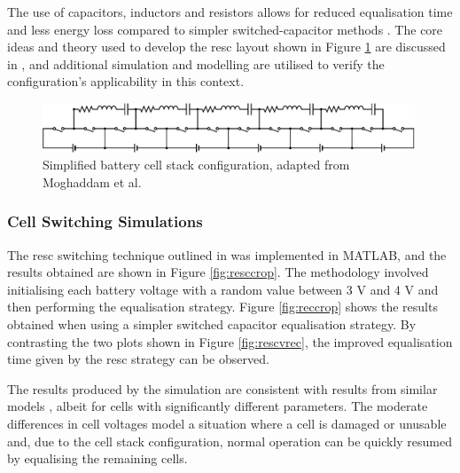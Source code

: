 The use of capacitors, inductors and resistors allows for reduced equalisation time and less energy loss compared to simpler switched-capacitor methods \cite{8467638}. The core ideas and theory used to develop the \gls{resc} layout shown in Figure \ref{fig:bcs} are discussed in \cite{8681672}, and additional simulation and modelling are utilised to verify the configuration's applicability in this context.

\begin{figure}[H]
\centering
\vspace{5mm}
\includegraphics[width=0.99\textwidth]{figs/Samuel/Figures/resc1-cropped.pdf}
\caption{Simplified battery cell stack configuration, adapted from Moghaddam et al. \cite{8467638}}
\label{fig:bcs}
\end{figure}

\subsubsection{Cell Switching Simulations}
\label{swit}

The \gls{resc} switching technique outlined in \cite{8467638} was implemented in MATLAB, and the results obtained are shown in Figure \ref{fig:resccrop}. The methodology involved initialising each battery voltage with a random value between 3 V and 4 V and then performing the equalisation strategy. Figure \ref{fig:reccrop} shows the results obtained when using a simpler switched capacitor equalisation strategy. By contrasting the two plots shown in Figure \ref{fig:rescvrec}, the improved equalisation time given by the \gls{resc} strategy can be observed. 

The results produced by the simulation are consistent with results from similar models \cite{8467638}, albeit for cells with significantly different parameters. The moderate differences in cell voltages model a situation where a cell is damaged or unusable and, due to the cell stack configuration, normal operation can be quickly resumed by equalising the remaining cells.

